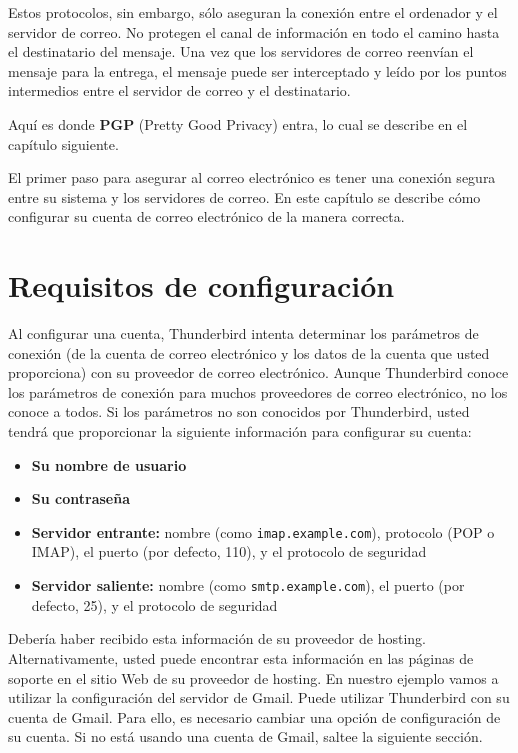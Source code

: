 \documentclass[10pt,a5paper,twoside,,]{book}
\providecommand{\tightlist}{%
  \setlength{\itemsep}{0pt}\setlength{\parskip}{0pt}}
\begin{document}
Estos protocolos, sin embargo, sólo aseguran la conexión entre el
ordenador y el servidor de correo. No protegen el canal de información
en todo el camino hasta el destinatario del mensaje. Una vez que los
servidores de correo reenvían el mensaje para la entrega, el mensaje
puede ser interceptado y leído por los puntos intermedios entre el
servidor de correo y el destinatario.

Aquí es donde \textbf{PGP} (Pretty Good Privacy) entra, lo cual se
describe en el capítulo siguiente.

El primer paso para asegurar al correo electrónico es tener una conexión
segura entre su sistema y los servidores de correo. En este capítulo se
describe cómo configurar su cuenta de correo electrónico de la manera
correcta.

\section{Requisitos de
configuración}\label{requisitos-de-configuraciuxf3n}

Al configurar una cuenta, Thunderbird intenta determinar los parámetros
de conexión (de la cuenta de correo electrónico y los datos de la cuenta
que usted proporciona) con su proveedor de correo electrónico. Aunque
Thunderbird conoce los parámetros de conexión para muchos proveedores de
correo electrónico, no los conoce a todos. Si los parámetros no son
conocidos por Thunderbird, usted tendrá que proporcionar la siguiente
información para configurar su cuenta:

\begin{itemize}
\tightlist
\item
  \textbf{Su nombre de usuario}
\item
  \textbf{Su contraseña}
\item
  \textbf{Servidor entrante:} nombre (como \texttt{imap.example.com}),
  protocolo (POP o IMAP), el puerto (por defecto, 110), y el protocolo
  de seguridad
\item
  \textbf{Servidor saliente:} nombre (como \texttt{smtp.example.com}),
  el puerto (por defecto, 25), y el protocolo de seguridad
\end{itemize}

Debería haber recibido esta información de su proveedor de hosting.
Alternativamente, usted puede encontrar esta información en las páginas
de soporte en el sitio Web de su proveedor de hosting. En nuestro
ejemplo vamos a utilizar la configuración del servidor de Gmail. Puede
utilizar Thunderbird con su cuenta de Gmail. Para ello, es necesario
cambiar una opción de configuración de su cuenta. Si no está usando una
cuenta de Gmail, saltee la siguiente sección.
\end{document}
